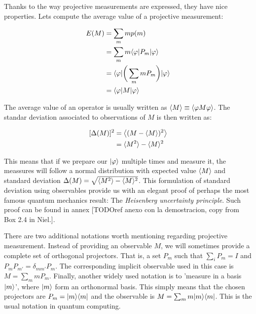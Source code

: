 Thanks to the way projective measurements are expressed, they have nice properties. Lets compute the average value of a projective measurement:

\begin{equation}
	\begin{split}
		E(M)	& = \sum_m m p(m) \\
				& = \sum_m m \langle \varphi | P_m | \varphi \rangle \\
				& = \langle \varphi | \bigg( \sum_m m P_m \bigg) | \varphi \rangle \\
				& = \langle \varphi | M | \varphi \rangle
	\end{split}
\end{equation}

The average value of an operator is usually written as $\langle M \rangle \equiv \langle \varphi M \varphi \rangle$. The standar deviation associated to observations of $M$ is then written as:

\begin{equation}
	\begin{split}
	[\Delta(M)]^2	& = \big\langle (M - \langle M \rangle )^2 \big\rangle\\
					& = \langle M^2 \rangle - \langle M \rangle^2
	\end{split}
\end{equation}

This means that if we prepare our $|\varphi\rangle$ multiple times and measure it, the meassures will follow a normal distribution with expected value $\langle M \rangle$ and standard deviation $\Delta(M) = \sqrt{\langle M^2 \rangle - \langle M \rangle^2}$. This formulation of standard deviation using observables provide us with an elegant proof of perhaps the most famous quantum mechanics result: The \emph{Heisenberg uncertainty principle}. Such proof can be found in annex [TODOref anexo con la demostracion, copy from Box 2.4 in Niel.].

There are two additional notations worth mentioning regarding projective measurement. Instead of providing an observable $M$, we will sometimes provide a complete set of orthogonal projectors. That is, a set $P_m$ such that $\sum_i P_m = I$ and $P_m P_{m'} = \delta_{mm'} P_m$. The corresponding implicit observable used in this case is $M = \sum_m m P_m$. Finally, another widely used notation is to 'measure in a basis $|m\rangle$', where $|m\rangle$ form an orthonormal basis. This simply means that the chosen projectors are  $P_m = |m \rangle\langle m|$ and the observable is $M = \sum_m m |m \rangle\langle m|$. This is the usual notation in quantum computing.


